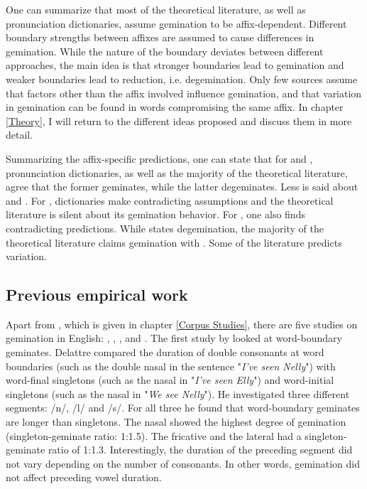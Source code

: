  
One can summarize that most of the theoretical literature, as well as pronunciation dictionaries, assume gemination to be affix-dependent. Different boundary strengths between affixes are assumed to cause differences in gemination. While the nature of the boundary deviates between different approaches, the main idea is that stronger boundaries lead to gemination and weaker boundaries lead to reduction, i.e. degemination. Only few sources assume that factors other than the affix involved influence gemination, and that variation in gemination can be found in words compromising the same affix.  In chapter \ref{Theory}, I will return to the different ideas proposed and discuss them in more detail. 

Summarizing the affix-specific predictions, one can state that for  and , pronunciation dictionaries, as well as the majority of the theoretical literature, agree that the former geminates, while the latter degeminates. Less is said about  and . For , dictionaries make contradicting assumptions and the theoretical literature is silent about its gemination behavior. For , one also finds contradicting predictions. While \cite{Wells.2008} states degemination, the majority of the theoretical literature claims gemination with . Some of the literature predicts variation. 

\subsection{Previous empirical work}\label{previous empirical work}

Apart from \cite{BenHedia.2017}, which is given in chapter \ref{Corpus Studies}, there are five studies on gemination in English: \cite{Delattre.}, \cite{ Kaye.2005}, \cite{Oh.2012}, \cite{Oh.2013}   and \cite{Kotzor.2016}.   %
The first study by \cite{Delattre.} looked at word-boundary geminates. Delattre compared the duration of double consonants at word boundaries (such as the double nasal  in the sentence "\textit{I've seen Nelly}") with word-final singletons (such as the nasal in "\textit{I've seen Elly}") and word-initial singletons (such as the nasal in "\textit{We see Nelly}"). He investigated three different segments: /n/, /l/ and /s/. For all three he found that word-boundary geminates are longer than singletons. The nasal showed the highest degree of gemination (singleton-geminate ratio: 1:1.5). The fricative and the lateral had a singleton-geminate ratio of 1:1.3. Interestingly, the duration of the preceding segment did not vary depending on the number of consonants. In other words, gemination did not affect preceding vowel duration.

